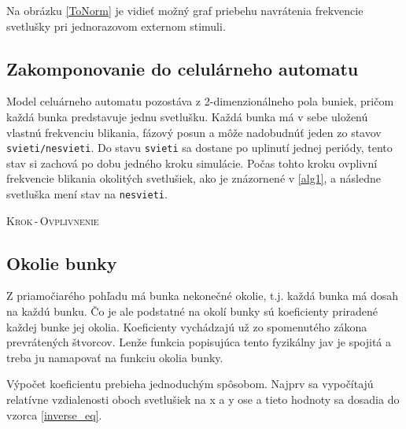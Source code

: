 \documentclass[a4paper, 11pt]{article}
\begin{document}
Na obrázku \ref{ToNorm} je vidieť možný graf priebehu navrátenia frekvencie svetlušky pri jednorazovom externom stimuli.


\subsection{Zakomponovanie do celulárneho automatu} \label{sec_celular}

Model celuárneho automatu pozostáva z 2-dimenzionálneho pola buniek, pričom každá bunka predstavuje jednu svetlušku. Každá bunka má v sebe uloženú vlastnú frekvenciu blikania, fázový posun a môže nadobudnúť jeden zo stavov \texttt{svieti/nesvieti}. Do stavu \texttt{svieti} sa dostane po uplinutí jednej periódy, tento stav si zachová po dobu jedného kroku simulácie. Počas tohto kroku ovplivní frekvencie blikania okolitých svetlušiek, ako je znázornené v \ref{alg1}, a následne svetluška mení stav na \texttt{nesvieti}.

\vspace{1em}
\begin{algorithm}[h]
\DontPrintSemicolon
{}

\Indp
\SetNlSty{}{}{}
\caption{\textsc{Krok\,-\,Ovplivnenie}\label{alg1}}     
\end{algorithm}

\subsection{Okolie bunky}

Z priamočiarého pohľadu má bunka nekonečné okolie, t.j. každá bunka má dosah na každú bunku. Čo je ale podstatné na okolí bunky sú koeficienty priradené každej bunke jej okolia. Koeficienty vychádzajú už zo spomenutého zákona prevrátených štvorcov. Lenže funkcia popisujúca tento fyzikálny jav je spojitá a treba ju namapovať na funkciu okolia bunky.



Výpočet koeficientu prebieha jednoduchým spôsobom. Najprv sa vypočítajú relatívne vzdialenosti oboch svetlušiek na x a y ose a tieto hodnoty sa dosadia do vzorca \ref{inverse_eq}.
\end{document}

